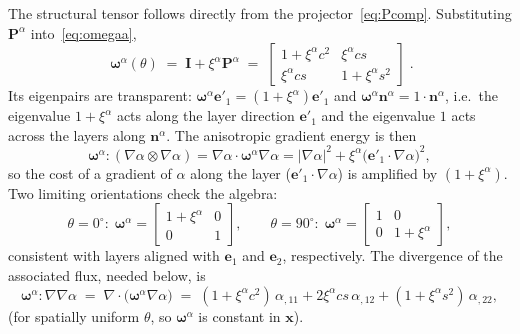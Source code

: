 \documentclass[12pt,a4paper]{article}
\newcommand{\bI}{\mathbf{I}}
\newcommand{\bn}{\mathbf{n}}
\newcommand{\bx}{\mathbf{x}}
\newcommand{\bP}{\mathbf{P}}
\newcommand{\bomega}{\boldsymbol{\omega}}
\begin{document}
	The structural tensor follows directly from the
	projector~\eqref{eq:Pcomp}. Substituting $\bP^{\alpha}$
	into~\eqref{eq:omegaa},
	\begin{equation}\label{eq:omega_theta}
		\boxed{\;
		\bomega^{\alpha}(\theta) \;=\; \bI + \xi^{\alpha}\bP^{\alpha}
		\;=\;
		\begin{bmatrix}
			1+\xi^{\alpha}c^2 & \xi^{\alpha}cs\\[2pt]
			\xi^{\alpha}cs & 1+\xi^{\alpha}s^2
		\end{bmatrix}\;.}
	\end{equation}
	Its eigenpairs are transparent: $\bomega^{\alpha}\mathbf{e}'_1=(1+\xi^{\alpha})\mathbf{e}'_1$
	and $\bomega^{\alpha}\bn^{\alpha}=1\cdot\bn^{\alpha}$, i.e.\ the eigenvalue
	$1+\xi^{\alpha}$ acts along the layer direction $\mathbf{e}'_1$ and the
	eigenvalue $1$ acts across the layers along $\bn^{\alpha}$. The anisotropic
	gradient energy is then
	\begin{equation}\label{eq:gradenergy}
		\bomega^{\alpha}\!:(\nabla\alpha\otimes\nabla\alpha)
		= \nabla\alpha\cdot\bomega^{\alpha}\nabla\alpha
		= |\nabla\alpha|^2 + \xi^{\alpha}\bigl(\mathbf{e}'_1\cdot\nabla\alpha\bigr)^2 ,
	\end{equation}
	so the cost of a gradient of $\alpha$ along the layer ($\mathbf{e}'_1\cdot\nabla\alpha$)
	is amplified by $(1+\xi^{\alpha})$. Two limiting orientations check the algebra:
	\begin{equation}
		\theta=0^\circ:\;\bomega^{\alpha}=\!\begin{bmatrix}1+\xi^{\alpha}&0\\0&1\end{bmatrix}\!,
		\qquad
		\theta=90^\circ:\;\bomega^{\alpha}=\!\begin{bmatrix}1&0\\0&1+\xi^{\alpha}\end{bmatrix}\!,
	\end{equation}
	consistent with layers aligned with $\mathbf{e}_1$ and $\mathbf{e}_2$,
	respectively. The divergence of the associated flux, needed below, is
	\begin{equation}\label{eq:omega_div}
		\bomega^{\alpha}\!:\nabla\nabla\alpha
		\;=\; \nabla\cdot\!\bigl(\bomega^{\alpha}\nabla\alpha\bigr)
		\;=\; (1+\xi^{\alpha}c^2)\,\alpha_{,11}
		+ 2\xi^{\alpha}cs\,\alpha_{,12}
		+ (1+\xi^{\alpha}s^2)\,\alpha_{,22},
	\end{equation}
	(for spatially uniform $\theta$, so $\bomega^{\alpha}$ is constant in $\bx$).

\end{document}
